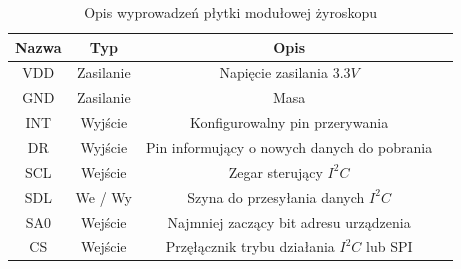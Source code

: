 \begin{table}[hb]
  \centering
  \caption{Opis wyprowadzeń płytki modułowej żyroskopu}
  \begin{tabular}{ | c | c | c | p{1.75cm} |} \hline
    Nazwa & Typ & Opis \\ \hline
    VDD & Zasilanie & Napięcie zasilania $3.3V$ \\
    GND & Zasilanie & Masa \\
    INT & Wyjście & Konfigurowalny pin przerywania \\
    DR  & Wyjście & Pin informujący o nowych danych do pobrania \\
    SCL & Wejście & Zegar sterujący $I^{2}C$ \\
    SDL & We / Wy & Szyna do przesyłania danych $I^{2}C$ \\
    SA0 & Wejście & Najmniej zaczący bit adresu urządzenia \\
    CS  & Wejście & Przęłącznik trybu działania $I^{2}C$ lub SPI \\ \hline
  \end{tabular}
  \label{tab:L3G4200DModOut}
\end{table}
 

